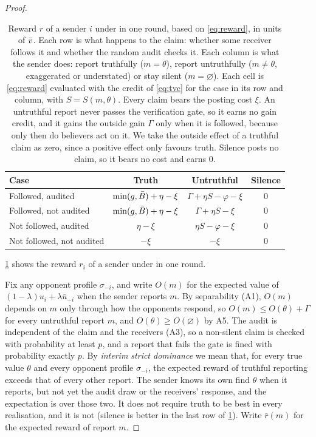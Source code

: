 \begin{proof}
\begin{table}[t]
  \caption{Reward $r$ of a sender $i$ under \tvc{} in one round, based on \cref{eq:reward}, in units of $\bar v$. Each row is what happens to the claim: whether some receiver follows it and whether the random audit checks it. Each column is what the sender does: report truthfully ($m=\theta$), report untruthfully ($m\neq\theta$, exaggerated or understated) or stay silent ($m=\varnothing$). Each cell is \cref{eq:reward} evaluated with the credit of \cref{eq:tvc} for the case in its row and column, with $S=S(m,\theta)$. Every claim bears the posting cost $\xi$. An untruthful report never passes the verification gate, so it earns no gain credit, and it gains the outside gain $\Gamma$ only when it is followed, because only then do believers act on it. We take the outside effect of a truthful claim as zero, since a positive effect only favours truth. Silence posts no claim, so it bears no cost and earns $0$.}
  \label{tab:cases}
  \centering
  \small
  \setlength{\textwidth}{3pt}
  \begin{tabular}{lccc}
    \toprule
    Case & Truth & Untruthful & Silence \\
    \midrule
    Followed, audited         & $\min(g,\bar B)+\eta-\xi$ & $\Gamma+\eta S-\varphi-\xi$ & $0$ \\
    Followed, not audited     & $\min(g,\bar B)+\eta-\xi$ & $\Gamma+\eta S-\xi$         & $0$ \\
    Not followed, audited     & $\eta-\xi$               & $\eta S-\varphi-\xi$        & $0$ \\
    Not followed, not audited & $-\xi$                   & $-\xi$                      & $0$ \\
    \bottomrule
  \end{tabular}
\end{table}

\cref{tab:cases} shows the reward $r_i$ of a sender under \tvc{} in one round.

Fix any opponent profile $\sigma_{-i}$, and write $O(m)$ for the expected value of $(1-\lambda)u_i+\lambda\bar u_{-i}$ when the sender reports $m$. By separability (A1), $O(m)$ depends on $m$ only through how the opponents respond, so $O(m)\le O(\theta)+\Gamma$ for every untruthful report $m$, and $O(\theta)\ge O(\varnothing)$ by A5. The audit is independent of the claim and the receivers (A3), so a non-silent claim is checked with probability at least $p$, and a report that fails the gate is fined with probability exactly $p$. By \emph{interim strict dominance} we mean that, for every true value $\theta$ and every opponent profile $\sigma_{-i}$, the expected reward of truthful reporting exceeds that of every other report. The sender knows its own find $\theta$ when it reports, but not yet the audit draw or the receivers' response, and the expectation is over those two. It does not require truth to be best in every realisation, and it is not (silence is better in the last row of \cref{tab:cases}). Write $\bar r(m)$ for the expected reward of report $m$.


\end{proof}
